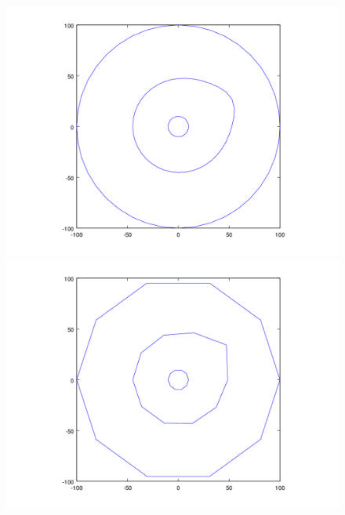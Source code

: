 \begin{figure}[H]
\centering
\begin{minipage}{0.30\textwidth}
  \centering
    \includegraphics[width=1\textwidth]{imgs/comp_angulos/comp_angs_iso0.png}
  \caption{}
  \label{fig:comp_angs_iso0}
\end{minipage}%
\hspace{0.03\textwidth}
\begin{minipage}{0.30\textwidth}   
  \centering
    \includegraphics[width=1\textwidth]{imgs/comp_angulos/comp_angs_iso3.png} 
  \caption{}
  \label{fig:comp_angs_iso3}
\end{minipage}%
\hspace{0.03\textwidth}
\begin{minipage}{0.30\textwidth}   

\end{minipage}
\end{figure}
